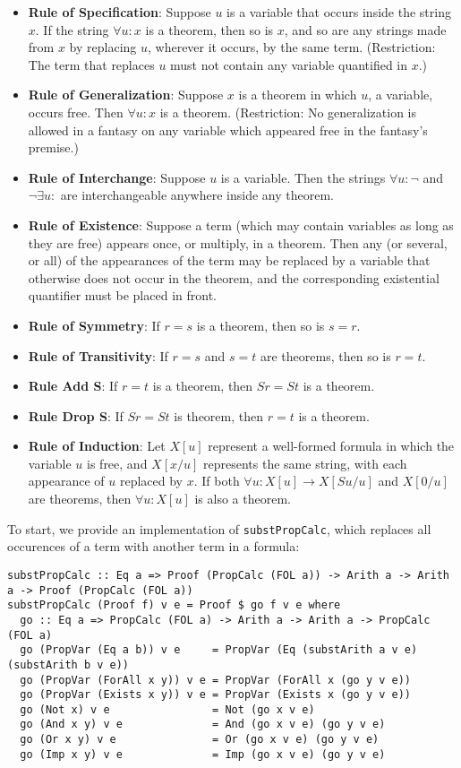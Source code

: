 \documentclass{article}
\begin{document}
\begin{itemize}
\item \textbf{Rule of Specification}: Suppose $u$ is a variable that occurs inside the string $x$. If the string $\forall u:x$ is a theorem, then so is $x$, and so are any strings made from $x$ by replacing $u$, wherever it occurs, by the same term. (Restriction: The term that replaces $u$ must not contain any variable quantified in $x$.)
\item \textbf{Rule of Generalization}: Suppose $x$ is a theorem in which $u$, a variable, occurs free. Then $\forall u:x$ is a theorem. (Restriction: No generalization is allowed in a fantasy on any variable which appeared free in the fantasy's premise.)
\item \textbf{Rule of Interchange}: Suppose $u$ is a variable. Then the strings $\forall u:\neg$ and $\neg \exists u:$ are interchangeable anywhere inside any theorem.
\item \textbf{Rule of Existence}: Suppose a term (which may contain variables as long as they are free) appears once, or multiply, in a theorem. Then any (or several, or all) of the appearances of the term may be replaced by a variable that otherwise does not occur in the theorem, and the corresponding existential quantifier must be placed in front.
\item \textbf{Rule of Symmetry}: If $r=s$ is a theorem, then so is $s=r$.
\item \textbf{Rule of Transitivity}: If $r=s$ and $s=t$ are theorems, then so is $r=t$.
\item \textbf{Rule Add S}: If $r=t$ is a theorem, then $Sr=St$ is a theorem.
\item \textbf{Rule Drop S}: If $Sr=St$ is theorem, then $r=t$ is a theorem.
\item \textbf{Rule of Induction}: Let $X[u]$ represent a well-formed formula in which the variable $u$ is free, and $X[x/u]$ represents the same string, with each appearance of $u$ replaced by $x$. If both $\forall u:X[u] \to X[Su/u]$ and $X[0/u]$ are theorems, then $\forall u:X[u]$ is also a theorem.
\end{itemize}

To start, we provide an implementation of \texttt{substPropCalc}, which replaces all occurences of a term with another term in a formula:

\begin{lstlisting}
substPropCalc :: Eq a => Proof (PropCalc (FOL a)) -> Arith a -> Arith a -> Proof (PropCalc (FOL a))
substPropCalc (Proof f) v e = Proof $ go f v e where
  go :: Eq a => PropCalc (FOL a) -> Arith a -> Arith a -> PropCalc (FOL a)
  go (PropVar (Eq a b)) v e     = PropVar (Eq (substArith a v e) (substArith b v e))
  go (PropVar (ForAll x y)) v e = PropVar (ForAll x (go y v e))
  go (PropVar (Exists x y)) v e = PropVar (Exists x (go y v e))
  go (Not x) v e                = Not (go x v e)
  go (And x y) v e              = And (go x v e) (go y v e)
  go (Or x y) v e               = Or (go x v e) (go y v e)
  go (Imp x y) v e              = Imp (go x v e) (go y v e)
\end{lstlisting}
\end{document}
